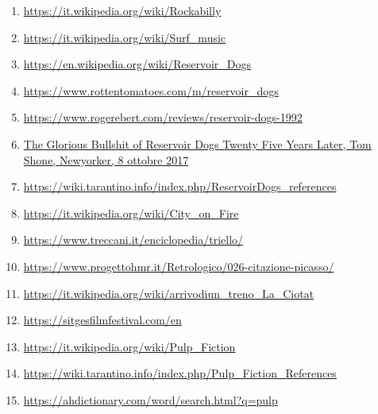 \documentclass[12pt]{article} %
\begin{document}
\begin{flushleft}
\begin{enumerate}
        \item \href{https://it.wikipedia.org/wiki/Rockabilly}{https://it.wikipedia.org/wiki/Rockabilly}
        \item \href{https://it.wikipedia.org/wiki/Surf_music}{https://it.wikipedia.org/wiki/Surf\_music}
        \item \href{https://en.wikipedia.org/wiki/Reservoir_Dogs}{https://en.wikipedia.org/wiki/Reservoir\_Dogs}
        \item \href{https://www.rottentomatoes.com/m/reservoir_dogs}{https://www.rottentomatoes.com/m/reservoir\_dogs}
        \item \href{https://www.rogerebert.com/reviews/reservoir-dogs-1992}{https://www.rogerebert.com/reviews/reservoir-dogs-1992}
        \item \href{https://www.newyorker.com/culture/cultural-comment/the-glorious-bullshit-of-reservoir-dogs-twenty-five-years-later}{The Glorious Bullshit of Reservoir Dogs Twenty Five Years Later, Tom Shone, Newyorker, 8 ottobre 2017}
        \item \href{https://wiki.tarantino.info/index.php/Reservoir_Dogs_movie_references_guide}{https://wiki.tarantino.info/index.php/ReservoirDogs\_references}
        \item \href{https://it.wikipedia.org/wiki/City_on_Fire_(film_1987)}{https://it.wikipedia.org/wiki/City\_on\_Fire}
        \item \href{https://www.treccani.it/enciclopedia/triello_(altro)/}{https://www.treccani.it/enciclopedia/triello/}
        \item \href{https://www.progettohmr.it/Retrologico/026-citazione-picasso/}{https://www.progettohmr.it/Retrologico/026-citazione-picasso/}
        \item \href{https://it.wikipedia.org/wiki/L%27arrivo_di_un_treno_alla_stazione_di_La_Ciotat}{https://it.wikipedia.org/wiki/arrivodiun\_treno\_La\_Ciotat}
        \item \href{https://sitgesfilmfestival.com/en}{https://sitgesfilmfestival.com/en}
        \item \href{https://it.wikipedia.org/wiki/Pulp_Fiction}{https://it.wikipedia.org/wiki/Pulp\_Fiction}
        \item \href{https://wiki.tarantino.info/index.php/Pulp_Fiction_Movie_References_Guide}{https://wiki.tarantino.info/index.php/Pulp\_Fiction\_References}
        \item \href{https://ahdictionary.com/word/search.html?q=pulp}{https://ahdictionary.com/word/search.html?q=pulp}

\end{enumerate}
\end{flushleft}
\end{document}
